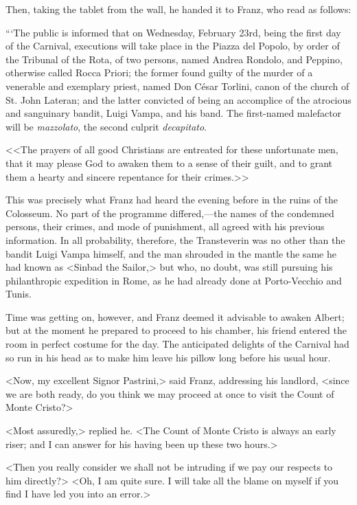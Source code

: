  Then, taking the tablet from the wall, he handed it to Franz, who read as follows: 

 “‘The public is informed that on Wednesday, February 23rd, being the first day of the Carnival, executions will take place in the Piazza del Popolo, by order of the Tribunal of the Rota, of two persons, named Andrea Rondolo, and Peppino, otherwise called Rocca Priori; the former found guilty of the murder of a venerable and exemplary priest, named Don César Torlini, canon of the church of St. John Lateran; and the latter convicted of being an accomplice of the atrocious and sanguinary bandit, Luigi Vampa, and his band. The first-named malefactor will be \textit{mazzolato}, the second culprit \textit{decapitato}. 

 <<The prayers of all good Christians are entreated for these unfortunate men, that it may please God to awaken them to a sense of their guilt, and to grant them a hearty and sincere repentance for their crimes.>> 

 This was precisely what Franz had heard the evening before in the ruins of the Colosseum. No part of the programme differed,—the names of the condemned persons, their crimes, and mode of punishment, all agreed with his previous information. In all probability, therefore, the Transteverin was no other than the bandit Luigi Vampa himself, and the man shrouded in the mantle the same he had known as <Sinbad the Sailor,> but who, no doubt, was still pursuing his philanthropic expedition in Rome, as he had already done at Porto-Vecchio and Tunis. 

 Time was getting on, however, and Franz deemed it advisable to awaken Albert; but at the moment he prepared to proceed to his chamber, his friend entered the room in perfect costume for the day. The anticipated delights of the Carnival had so run in his head as to make him leave his pillow long before his usual hour. 

 <Now, my excellent Signor Pastrini,> said Franz, addressing his landlord, <since we are both ready, do you think we may proceed at once to visit the Count of Monte Cristo?> 

 <Most assuredly,> replied he. <The Count of Monte Cristo is always an early riser; and I can answer for his having been up these two hours.> 

 <Then you really consider we shall not be intruding if we pay our respects to him directly?>  <Oh, I am quite sure. I will take all the blame on myself if you find I have led you into an error.> 

